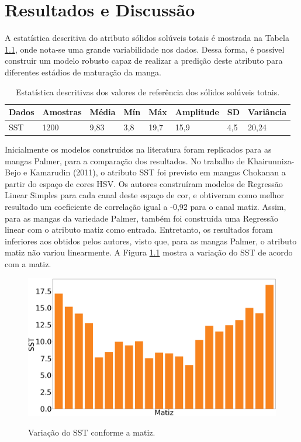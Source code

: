 \chapter{Resultados e Discussão} \label{ch:RD}

A estatística descritiva do atributo sólidos solúveis totais é mostrada na Tabela \ref{tbl:sst_stat}, onde nota-se uma grande variabilidade nos dados. Dessa forma, é possível construir um modelo robusto capaz de realizar a predição deste atributo para diferentes estádios de maturação da manga.

\begin{table}[H]
\centering
\caption{Estatística descritivas dos valores de referência dos sólidos solúveis totais.} \label{tbl:sst_stat}
\begin{tabular}{llllllll}
\hline
Dados     & Amostras & M\'edia & M\'in & M\'ax & Amplitude & SD & Vari\^ancia   \\
\hline
SST     & 1200 & 9,83 &  3,8 &  19,7 &  15,9 &  4,5 &  20,24 \\
\hline
\end{tabular}
\end{table}

Inicialmente os modelos construídos na literatura foram replicados para as mangas Palmer, para a comparação dos resultados. No trabalho de Khairunniza-Bejo e Kamarudin (2011), o atributo SST foi previsto em mangas Chokanan a partir do espaço de cores HSV. Os autores construíram modelos de Regressão Linear Simples para cada canal deste espaço de cor, e obtiveram como melhor resultado um coeficiente de correlação igual a -0,92 para o canal matiz. Assim, para as mangas da variedade Palmer, também foi construída uma Regressão linear com o atributo matiz como entrada. Entretanto, os resultados foram inferiores aos obtidos pelos autores, visto que, para as mangas Palmer, o atributo matiz não variou linearmente. A Figura \ref{fig:hue_sst} mostra a variação do SST de acordo com a matiz. 

\begin{figure}[H]
\centering
	\caption{Variação do SST conforme a matiz.}
	\includegraphics[scale=0.18]{img/hue_sst_palmer.png}
	\label{fig:hue_sst}
\end{figure}

